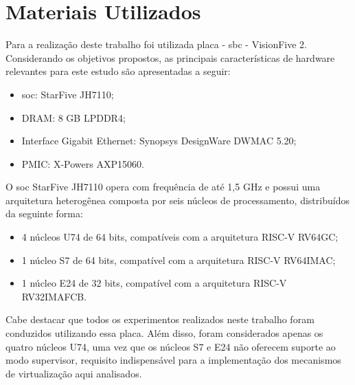\chapter{Materiais Utilizados}

Para a realização deste trabalho foi utilizada placa - \gls{sbc} - VisionFive 2. Considerando os objetivos propostos, as principais características de hardware
relevantes para este estudo são apresentadas a seguir:

\begin{itemize}
\item \gls{soc}: StarFive JH7110;
\item DRAM: 8 GB LPDDR4;
\item Interface Gigabit Ethernet: Synopsys DesignWare DWMAC 5.20;
\item PMIC: X-Powers AXP15060.
\end{itemize}

O \gls{soc} StarFive JH7110 opera com frequência de até 1,5 GHz e possui uma arquitetura heterogênea composta por seis núcleos de processamento, distribuídos da seguinte forma:

\begin{itemize}
\item 4 núcleos U74 de 64 bits, compatíveis com a arquitetura RISC-V RV64GC;
\item 1 núcleo S7 de 64 bits, compatível com a arquitetura RISC-V RV64IMAC;
\item 1 núcleo E24 de 32 bits, compatível com a arquitetura RISC-V RV32IMAFCB.
\end{itemize}

Cabe destacar que todos os experimentos realizados neste trabalho foram conduzidos utilizando essa placa. Além disso, foram considerados apenas os quatro núcleos U74,
uma vez que os núcleos S7 e E24 não oferecem suporte ao modo supervisor, requisito indispensável para a implementação dos mecanismos de virtualização aqui analisados.
